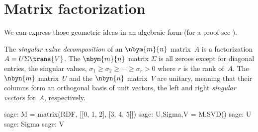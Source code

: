\section{Matrix factorization}

We can express those geometric ideas in an algebraic form
(for a proof see \cite{TrefethenBau97}).

The \textit{singular value decomposition} of an $\nbym{m}{n}$ matrix~$A$
is a factorization $A=U\Sigma \trans{V}$.
The $\nbym{m}{n}$ matrix $\Sigma$ 
is all zeroes except for diagonal entries, the singular values, 
$\sigma_1\geq \sigma_2 \geq \cdots \geq \sigma_r> 0$ where $r$ is the
rank of~$A$.
The $\nbyn{m}$ matrix~$U$ and the $\nbyn{n}$ matrix~$V$ are unitary, meaning
that their columns form an orthogonal basis of unit vectors, the left and 
right \textit{singular vectors} for~$A$, respectively. 
\begin{sagecommandline}
sage: M = matrix(RDF, [[0, 1, 2], [3, 4, 5]])
sage: U,Sigma,V = M.SVD()
sage: U
sage: Sigma
sage: V  
\end{sagecommandline}

